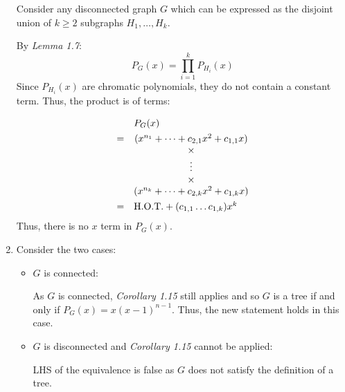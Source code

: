 \documentclass[a4paper, 11pt]{article}
\begin{document}
\begin{multicols*}{2}
\begin{enumerate}[label=(\alph*)]
		      Consider any disconnected graph $G$ which can be expressed as the disjoint union of $k\geq2$ subgraphs $H_1,\dots,H_k$.

		      By \textit{Lemma 1.7}:
		      $$P_G(x)= \prod_{i=1}^k P_{H_i}(x)$$
		      Since $P_{H_i}(x)$ are chromatic polynomials, they do not contain a constant term. Thus, the product is of terms:

		      \begin{align*}
			       & \begin{matrix}
				          & \hphantom{=} P_G(x) \\
			         \end{matrix}                         \\
			       & \begin{matrix}
				         = & (x^{n_1} + \dots + c_{2,1}x^2 + c_{1,1}x ) \\
				           & \times                                     \\
				           & \vdots                                     \\
				           & \times                                     \\
				           & (x^{n_k} + \dots + c_{2,k}x^2 + c_{1,k}x )
			         \end{matrix} \\
			       & \begin{matrix}
				         = & \text{H.O.T.} + (c_{1,1}\dots c_{1,k})x^k \\
			         \end{matrix}  \\
		      \end{align*}
		      Thus, there is no $x$ term in $P_G(x)$.

		\item Consider the two cases:

		      \begin{itemize}
			      \item
			            $G$ is connected:

			            As $G$ is connected, \textit{Corollary 1.15} still applies and so $G$ is a tree if and only if $P_G(x)=x(x-1)^{n-1}$. Thus, the new statement holds in this case.
			      \item
			            $G$ is disconnected and \textit{Corollary 1.15} cannot be applied:

			            LHS of the equivalence is false as $G$ does not satisfy the definition of a tree.


\end{itemize}
\end{enumerate}
\end{multicols*}
\end{document}
